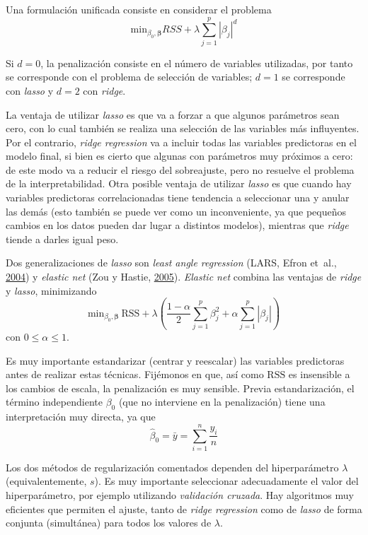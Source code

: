 \documentclass[
  spanish,
]{book}
\theoremstyle{break}
\theoremstyle{definition}
\theoremstyle{definition}
\theoremstyle{definition}
\theoremstyle{remark}
\begin{document}
Una formulación unificada consiste en considerar el problema
\[\mbox{min}_{\beta_0, \boldsymbol{\beta}} RSS + \lambda\sum_{j=1}^{p}|\beta_{j}|^d\]

Si \(d=0\), la penalización consiste en el número de variables utilizadas, por tanto se corresponde con el problema de selección de variables; \(d=1\) se corresponde con \emph{lasso} y \(d=2\) con \emph{ridge}.

La ventaja de utilizar \emph{lasso} es que va a forzar a que algunos parámetros sean cero, con lo cual también se realiza una selección de las variables más influyentes.
Por el contrario, \emph{ridge regression} va a incluir todas las variables predictoras en el modelo final, si bien es cierto que algunas con parámetros muy próximos a cero: de este modo va a reducir el riesgo del sobreajuste, pero no resuelve el problema de la interpretabilidad.
Otra posible ventaja de utilizar \emph{lasso} es que cuando hay variables predictoras correlacionadas tiene tendencia a seleccionar una y anular las demás (esto también se puede ver como un inconveniente, ya que pequeños cambios en los datos pueden dar lugar a distintos modelos), mientras que \emph{ridge} tiende a darles igual peso.

Dos generalizaciones de \emph{lasso} son \emph{least angle regression} (LARS, Efron et~al., \protect\hyperlink{ref-efron2004least}{2004}) y \emph{elastic net} (Zou y Hastie, \protect\hyperlink{ref-zou2005regularization}{2005}).
\emph{Elastic net} combina las ventajas de \emph{ridge} y \emph{lasso}, minimizando
\[\mbox{min}_{\beta_0, \boldsymbol{\beta}} \ \mbox{RSS} + \lambda \left( \frac{1 - \alpha}{2}\sum_{j=1}^{p}\beta_{j}^{2} + \alpha \sum_{j=1}^{p}|\beta_{j}| \right)\]
con \(0 \leq \alpha \leq 1\).

Es muy importante estandarizar (centrar y reescalar) las variables predictoras antes de realizar estas técnicas.
Fijémonos en que, así como \(\mbox{RSS}\) es insensible a los cambios de escala, la penalización es muy sensible.
Previa estandarización, el término independiente \(\beta_0\) (que no interviene en la penalización) tiene una interpretación muy directa, ya que
\[\widehat \beta_0 = \bar y =\sum_{i=1}^n \frac{y_i}{n}\]

Los dos métodos de regularización comentados dependen del hiperparámetro \(\lambda\) (equivalentemente, \(s\)).
Es muy importante seleccionar adecuadamente el valor del hiperparámetro, por ejemplo utilizando \emph{validación cruzada}.
Hay algoritmos muy eficientes que permiten el ajuste, tanto de \emph{ridge regression} como de \emph{lasso} de forma conjunta (simultánea) para todos los valores de \(\lambda\).
\end{document}

